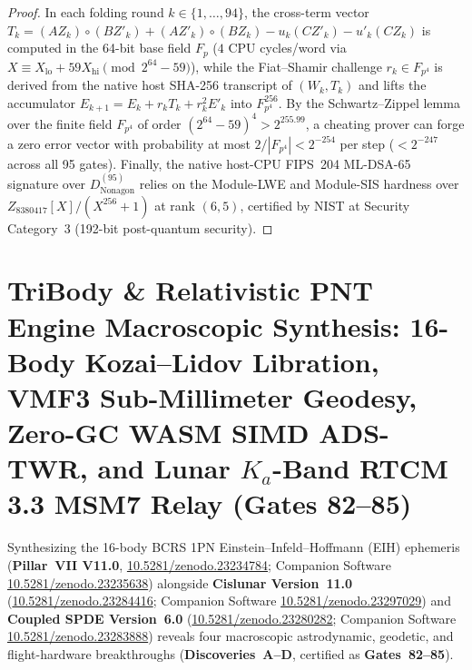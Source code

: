 \documentclass[11pt,a4paper,reqno]{article}
\def\bm#1{#1}%
\def\texttt#1{#1}%
\def\mathcal#1{#1}%
\def\mathbb#1{#1}%
\newcommand{\zenodo}[1]{\href{https://doi.org/10.5281/zenodo.#1}{\texttt{10.5281/\allowbreak zenodo.#1}}}
\theoremstyle{plain}
\theoremstyle{definition}
\theoremstyle{remark}
\numberwithin{equation}{section}
\begin{document}
\begin{proof}
In each folding round $k \in \{1,\dots,94\}$, the cross-term vector $\bm{T}_k = (\bm{A}\bm{Z}_k)\circ(\bm{B}\bm{Z}'_k) + (\bm{A}\bm{Z}'_k)\circ(\bm{B}\bm{Z}_k) - u_k(\bm{C}\bm{Z}'_k) - u'_k(\bm{C}\bm{Z}_k)$ is computed in the 64-bit base field $\mathbb{F}_p$ ($4$ CPU cycles/word via $X \equiv X_{\text{lo}} + 59 X_{\text{hi}} \pmod{2^{64}-59}$), while the Fiat--Shamir challenge $r_k \in \mathbb{F}_{p^4}$ is derived from the native host SHA-256 transcript of $(\bm{W}_k, \bm{T}_k)$ and lifts the accumulator $\bm{E}_{k+1} = \bm{E}_k + r_k \bm{T}_k + r_k^2 \bm{E}'_k$ into $\mathbb{F}_{p^4}^{256}$. By the Schwartz--Zippel lemma over the finite field $\mathbb{F}_{p^4}$ of order $(2^{64}-59)^4 > 2^{255.99}$, a cheating prover can forge a zero error vector with probability at most $2/|\mathbb{F}_{p^4}| < 2^{-254}$ per step ($< 2^{-247}$ across all 95 gates). Finally, the native host-CPU FIPS~204 ML-DSA-65 signature over $\mathcal{D}_{\text{Nonagon}}^{(95)}$ relies on the Module-LWE and Module-SIS hardness over $\mathbb{Z}_{8380417}[X]/(X^{256}+1)$ at rank $(6,5)$, certified by NIST at Security Category~3 (192-bit post-quantum security).
\end{proof}

\section{\texorpdfstring{TriBody \& Relativistic PNT Engine Macroscopic Synthesis: 16-Body Kozai--Lidov Libration, VMF3 Sub-Millimeter Geodesy, Zero-GC WASM SIMD ADS-TWR, and Lunar $K_a$-Band RTCM 3.3 MSM7 Relay (\texttt{Gates 82--85})}{TriBody and Relativistic PNT Engine Macroscopic Synthesis: 16-Body Kozai-Lidov Libration, VMF3 Sub-Millimeter Geodesy, Zero-GC WASM SIMD ADS-TWR, and Lunar Ka-Band RTCM 3.3 MSM7 Relay (Gates 82-85)}}
\label{sec:pillar8_tribody_discoveries_82_85}

Synthesizing the 16-body BCRS 1PN Einstein--Infeld--Hoffmann (EIH) ephemeris (\textbf{Pillar~VII V11.0}, \zenodo{23234784}; Companion Software \zenodo{23235638}) \cite{PillarVII_16Body_v11} alongside \textbf{Cislunar Version~11.0} (\zenodo{23284416}; Companion Software \zenodo{23297029}) \cite{PillarVI_Cislunar_v11} and \textbf{Coupled SPDE Version~6.0} (\zenodo{23280282}; Companion Software \zenodo{23283888}) \cite{PillarI_SPDE_v6} reveals four macroscopic astrodynamic, geodetic, and flight-hardware breakthroughs (\textbf{Discoveries~A--D}, certified as \textbf{Gates~82--85}).
\end{document}
